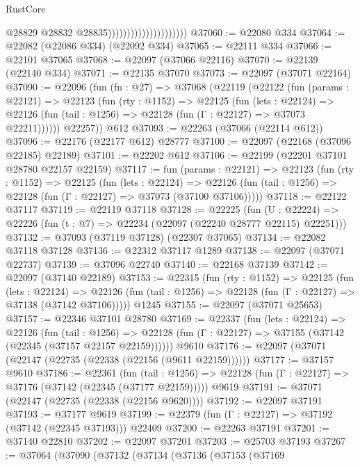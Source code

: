 \begin{lexlean}{RustCore}
\begin{coremodule}
                                              @28829
                                              @28832
                                              @28835)))))))))))))))))))))
@37060 := @22080 @334
@37064 := @22082 (@22086 @334) (@22092 @334)
@37065 := @22111 @334
@37066 := @22101 @37065
@37068 := @22097 (@37066 @22116)
@37070 := @22139 (@22140 @334)
@37071 := @22135 @37070
@37073 := @22097 (@37071 @22164)
@37090 := @22096
    (fun (fn : @27) =>
    @37068
      (@22119
        (@22122
          (fun (params : @22121) =>
          @22123
            (fun (rty : @1152) =>
            @22125
              (fun (lets : @22124) =>
              @22126 (fun (tail : @1256) => @22128 (fun (Γ : @22127) => @37073 @22211))))))
        @22257))
    @612
@37093 := @22263 (@37066 (@22114 @612))
@37096 := @22176 (@22177 @612) @28777
@37100 := @22097 (@22168 (@37096 @22185) @22189)
@37101 := @22202 @612
@37106 := @22199 (@22201 @37101 @28780 @22157 @22159)
@37117 := fun (params : @22121) =>
  @22123
    (fun (rty : @1152) =>
    @22125
      (fun (lets : @22124) =>
      @22126 (fun (tail : @1256) => @22128 (fun (Γ : @22127) => @37073 (@37100 @37106)))))
@37118 := @22122 @37117
@37119 := @22119 @37118
@37128 := @22225
    (fun (U : @22224) => @22226 (fun (t : @7) => @22234 (@22097 (@22240 @28777 @22115) @22251)))
@37132 := @37093 (@37119 @37128) (@22307 @37065)
@37134 := @22082 @37118 @37128
@37136 := @22312 @37117 @1289
@37138 := @22097 (@37071 @22737)
@37139 := @37096 @22740
@37140 := @22168 @37139
@37142 := @22097 (@37140 @22189)
@37153 := @22315
    (fun (rty : @1152) =>
    @22125
      (fun (lets : @22124) =>
      @22126 (fun (tail : @1256) => @22128 (fun (Γ : @22127) => @37138 (@37142 @37106)))))
    @1245
@37155 := @22097 (@37071 @25653)
@37157 := @22346 @37101 @28780
@37169 := @22337
    (fun (lets : @22124) =>
    @22126
      (fun (tail : @1256) =>
      @22128 (fun (Γ : @22127) => @37155 (@37142 (@22345 (@37157 @22157 @22159))))))
    @9610
@37176 := @22097 (@37071 (@22147 (@22735 (@22338 (@22156 (@9611 @22159))))))
@37177 := @37157 @9610
@37186 := @22361
    (fun (tail : @1256) => @22128 (fun (Γ : @22127) => @37176 (@37142 (@22345 (@37177 @22159)))))
    @9619
@37191 := @37071 (@22147 (@22735 (@22338 (@22156 @9620))))
@37192 := @22097 @37191
@37193 := @37177 @9619
@37199 := @22379 (fun (Γ : @22127) => @37192 (@37142 (@22345 @37193))) @22409
@37200 := @22263 @37191
@37201 := @37140 @22810
@37202 := @22097 @37201
@37203 := @25703 @37193
@37267 := @37064
    (@37090
      (@37132
        (@37134
          (@37136
            (@37153
              (@37169

\end{coremodule}
\end{lexlean}
